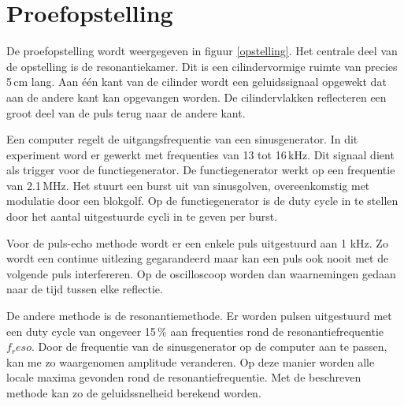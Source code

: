 \section{Proefopstelling}


De proefopstelling wordt weergegeven in figuur \ref{opstelling}. Het centrale 
deel van de opstelling is de resonantiekamer. Dit is een cilindervormige ruimte 
van precies 5\,cm lang. Aan \'e\'en kant van de cilinder wordt een 
geluidssignaal opgewekt dat aan de andere kant kan opgevangen worden. De 
cilindervlakken reflecteren een groot deel van de puls terug naar de andere 
kant. 

Een computer regelt de uitgangsfrequentie van een sinusgenerator. In dit 
experiment word er gewerkt met frequenties van 13 tot 16\,kHz. Dit signaal 
dient als trigger voor de functiegenerator. De functiegenerator werkt op een 
frequentie van 2.1\,MHz. Het stuurt een burst uit van sinusgolven, 
overeenkomstig met modulatie door een blokgolf. Op de functiegenerator is de 
duty cycle in te stellen door het aantal uitgestuurde cycli in te geven per 
burst.

Voor de puls-echo methode wordt er een enkele puls uitgestuurd aan 1 kHz. Zo 
wordt een continue uitlezing gegarandeerd maar kan een puls ook nooit met de 
volgende puls interfereren. Op de oscilloscoop worden dan waarnemingen gedaan 
naar de tijd tussen elke reflectie.

De andere methode is de resonantiemethode. Er worden pulsen uitgestuurd met een 
duty cycle van ongeveer 15\,\% aan frequenties rond de resonantiefrequentie 
$f_reso$. Door de frequentie van de sinusgenerator op de computer aan te 
passen, kan me zo waargenomen amplitude veranderen. Op deze manier worden alle 
locale maxima gevonden rond de resonantiefrequentie. Met de beschreven methode 
kan zo de geluidssnelheid berekend worden. 
